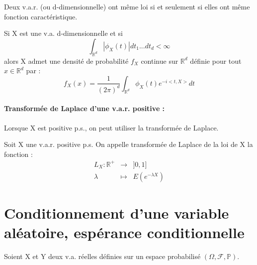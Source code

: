 \begin{theo}
Deux v.a.r. (ou d-dimensionnelle) ont même loi si et seulement si elles ont même fonction caractéristique.
\end{theo}

\begin{theo}
Si X est une v.a. d-dimensionnelle et si \[\int_{\mathbb{R}^d} |\phi_X(t)| dt_1...dt_d <\infty\]
alors X admet une densité de probabilité $f_X$ continue sur $\mathbb{R}^d$ définie pour tout $x\in \mathbb{R}^d$ par :
\[f_X(x)=\frac{1}{(2\pi)^d} \int_{\mathbb{R}^d} \phi_X(t) e^{-i<t,X>} dt\]
\end{theo}

\paragraph{Transformée de Laplace d'une v.a.r. positive : \\}
Lorsque X est positive p.s., on peut utiliser la transformée de Laplace.

\begin{Def}
Soit X une v.a.r. positive p.s. On appelle transformée de Laplace de la loi de X la fonction :
\begin{eqnarray*}
L_X : \mathbb{R}^+ &\to& ]0,1] \\
\lambda &\mapsto& E(e^{-\lambda X})
\end{eqnarray*}
\end{Def}

\section{Conditionnement d'une variable aléatoire, espérance conditionnelle}
Soient X et Y deux v.a. réelles définies sur un espace probabilisé $(\Omega, \mathcal{F}, \mathbb{P})$.
